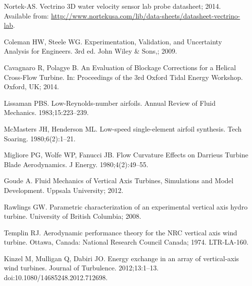 \documentclass[10pt,letterpaper]{article}
\begin{document}
\begin{thebibliography}{10}
    Nortek-{AS}. Vectrino 3{D} water velocity sensor lab probe datasheet; 2014.
    \newblock Available from:
      \url{http://www.nortekusa.com/lib/data-sheets/datasheet-vectrino-lab}.

    Coleman HW, Steele WG.
    \newblock Experimentation, Validation, and Uncertainty Analysis for Engineers.
    \newblock 3rd ed. John Wiley \& Sons,; 2009.

    Cavagnaro R, Polagye B.
    \newblock An Evaluation of Blockage Corrections for a Helical Cross-Flow
      Turbine.
    \newblock In: Proceedings of the 3rd Oxford Tidal Energy Workshop. Oxford, UK;
      2014.

    Lissaman PBS.
    \newblock Low-{R}eynolds-number airfoils.
    \newblock Annual Review of Fluid Mechanics. 1983;15:223--239.

    McMasters JH, Henderson ML.
    \newblock Low-speed single-element airfoil synthesis.
    \newblock Tech Soaring. 1980;6(2):1--21.

    Migliore PG, Wolfe WP, Fanucci JB.
    \newblock Flow Curvature Effects on {D}arrieus Turbine Blade Aerodynamics.
    \newblock J Energy. 1980;4(2):49--55.

    Goude A.
    \newblock Fluid Mechanics of Vertical Axis Turbines, Simulations and Model
      Development.
    \newblock Uppsala University; 2012.

    Rawlings GW.
    \newblock Parametric characterization of an experimental vertical axis hydro
      turbine.
    \newblock University of British Columbia; 2008.

    Templin RJ.
    \newblock Aerodynamic performance theory for the NRC vertical axis wind
      turbine.
    \newblock Ottawa, Canada: National Research Council Canada; 1974. LTR-LA-160.

    Kinzel M, Mulligan Q, Dabiri JO.
    \newblock Energy exchange in an array of vertical-axis wind turbines.
    \newblock Journal of Turbulence. 2012;13:1--13.
    \newblock doi:{10.1080/14685248.2012.712698}.

\end{thebibliography}
\end{document}
